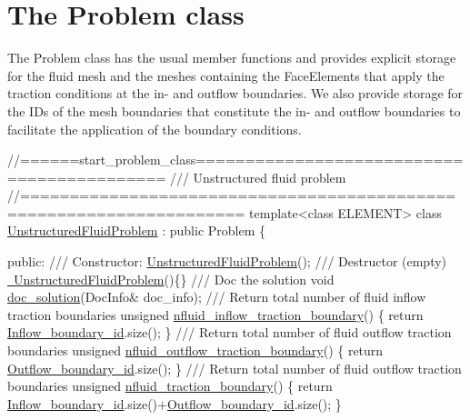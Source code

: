  

\hypertarget{index_class}{}\section{The Problem class}\label{index_class}
The {\ttfamily Problem} class has the usual member functions and provides explicit storage for the fluid mesh and the meshes containing the {\ttfamily Face\+Elements} that apply the traction conditions at the in-\/ and outflow boundaries. We also provide storage for the I\+Ds of the mesh boundaries that constitute the in-\/ and outflow boundaries to facilitate the application of the boundary conditions.

 
\begin{DoxyCodeInclude}
\textcolor{comment}{//======start\_problem\_class===========================================}
\textcolor{comment}{/// Unstructured fluid problem}
\textcolor{comment}{}\textcolor{comment}{//====================================================================}
\textcolor{keyword}{template}<\textcolor{keyword}{class} ELEMENT>
\textcolor{keyword}{class }\hyperlink{classUnstructuredFluidProblem}{UnstructuredFluidProblem} : \textcolor{keyword}{public} Problem
\{

\textcolor{keyword}{public}:
\textcolor{comment}{}
\textcolor{comment}{ /// Constructor: }
\textcolor{comment}{} \hyperlink{classUnstructuredFluidProblem_a9751f4afac540e148b3d90ae43dd5187}{UnstructuredFluidProblem}();
\textcolor{comment}{}
\textcolor{comment}{ /// Destructor (empty)}
\textcolor{comment}{} \hyperlink{classUnstructuredFluidProblem_a4d660faa6bae35197a4ea73139ac9963}{~UnstructuredFluidProblem}()\{\}
\textcolor{comment}{}
\textcolor{comment}{ /// Doc the solution}
\textcolor{comment}{} \textcolor{keywordtype}{void} \hyperlink{classUnstructuredFluidProblem_abcc9f0065665ae5239988b1a812e3f78}{doc\_solution}(DocInfo& doc\_info);
 \textcolor{comment}{}
\textcolor{comment}{ /// Return total number of fluid inflow traction boundaries}
\textcolor{comment}{} \textcolor{keywordtype}{unsigned} \hyperlink{classUnstructuredFluidProblem_a8afc18327561107094fa94f2918a385f}{nfluid\_inflow\_traction\_boundary}()
  \{
   \textcolor{keywordflow}{return} \hyperlink{classUnstructuredFluidProblem_a2923e009bcea7cdbdd7ea5788580a3f8}{Inflow\_boundary\_id}.size();
  \}
\textcolor{comment}{}
\textcolor{comment}{ /// Return total number of fluid outflow traction boundaries}
\textcolor{comment}{} \textcolor{keywordtype}{unsigned} \hyperlink{classUnstructuredFluidProblem_abcaa700f2e0e1b2097e7dc25fe087862}{nfluid\_outflow\_traction\_boundary}()
  \{
   \textcolor{keywordflow}{return} \hyperlink{classUnstructuredFluidProblem_a9bace139103152045dfe88e3d0163811}{Outflow\_boundary\_id}.size();
  \}
\textcolor{comment}{}
\textcolor{comment}{ /// Return total number of fluid outflow traction boundaries}
\textcolor{comment}{} \textcolor{keywordtype}{unsigned} \hyperlink{classUnstructuredFluidProblem_ae04e768e915a5e097527cea22558203d}{nfluid\_traction\_boundary}()
  \{
   \textcolor{keywordflow}{return} \hyperlink{classUnstructuredFluidProblem_a2923e009bcea7cdbdd7ea5788580a3f8}{Inflow\_boundary\_id}.size()+\hyperlink{classUnstructuredFluidProblem_a9bace139103152045dfe88e3d0163811}{Outflow\_boundary\_id}.size();
  \}


\end{DoxyCodeInclude}
